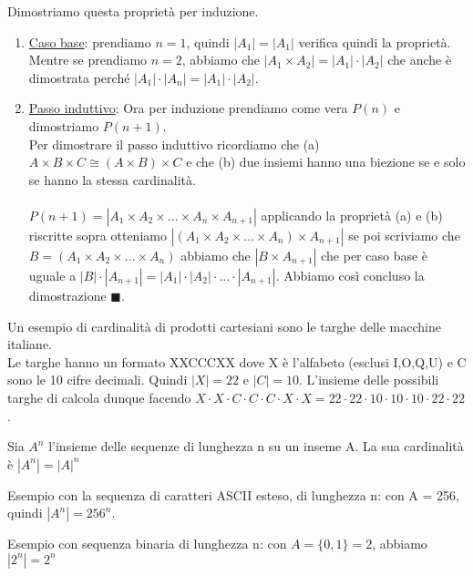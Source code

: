 \begin{demostration}
Dimostriamo questa proprietà per induzione.
\begin{enumerate}
    \item \underline{Caso base}: prendiamo $n = 1$, quindi $|A_1| = |A_1|$ verifica quindi la proprietà. Mentre se prendiamo $n = 2$, abbiamo che $|A_1 \times A_2| = |A_1| \cdot |A_2|$ che anche è dimostrata perché $|A_1| \cdot |A_n| = |A_1| \cdot |A_2|$.
    \item \underline{Passo induttivo}: Ora per induzione prendiamo come vera $P(n)$ e dimostriamo $P(n+1)$.\\
    Per dimostrare il passo induttivo ricordiamo che (a) $A \times B \times C \cong (A \times B) \times C$ e che (b) due insiemi hanno una biezione se e solo se hanno la stessa cardinalità.\\\\
    $P(n+1) = |A_1 \times A_2 \times ... \times A_{n} \times A_{n+1}|$ applicando la proprietà (a) e (b) riscritte sopra otteniamo $|(A_1 \times A_2 \times ... \times A_{n}) \times A_{n+1}|$ se poi scriviamo che $B = (A_1 \times A_2 \times ... \times A_{n})$ abbiamo che $|B \times A_{n+1}|$ che per caso base è uguale a $|B| \cdot |A_{n+1}| = |A_1| \cdot |A_2| \cdot ... \cdot |A_{n+1}|$. Abbiamo così concluso la dimostrazione $\blacksquare$.
\end{enumerate}
\end{demostration}

\begin{example}
Un esempio di cardinalità di prodotti cartesiani sono le targhe delle macchine italiane. \\
Le targhe hanno un formato XXCCCXX dove X è l'alfabeto (esclusi I,O,Q,U) e C sono le 10 cifre decimali. Quindi $|X| = 22$ e $|C| = 10$.
L'insieme delle possibili targhe di calcola dunque facendo $X \cdot X \cdot C \cdot C \cdot C \cdot X \cdot X = 22 \cdot 22 \cdot 10 \cdot 10 \cdot 10 \cdot 22 \cdot 22$.
\end{example}

\begin{corollar}
Sia $A^n$ l'insieme delle sequenze di lunghezza n su un inseme A. La sua cardinalità è $|A^n| = |A|^n$
\end{corollar}

\begin{example}
Esempio con la sequenza di caratteri ASCII esteso, di lunghezza n: con A = 256, quindi $|A^n| = 256^n$.
\end{example}
\begin{example}
Esempio con sequenza binaria di lunghezza n: con $A = \{0,1\} = 2$, abbiamo $|2^n| = 2^n$
\end{example}

